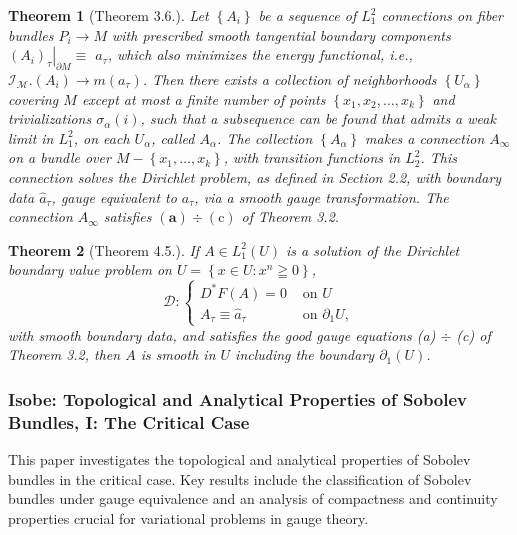 \documentclass[10pt, letterpaper]{article}
\theoremstyle{custom}
\newtheorem{theorem}{Theorem}[section]
\theoremstyle{definition}
\begin{document}
{\small
\begin{theorem}[Theorem 3.6.]
    Let $\left\{A_i\right\}$ be a sequence of $L_1^2$ connections on fiber bundles $P_i \rightarrow M$ with prescribed smooth tangential boundary components $\left.\left(A_i\right)_\tau\right|_{\partial M} \equiv$ $a_\tau$, which also minimizes the energy functional, i.e., $\mathscr{I}_{\mathcal{M}} .\left(A_i\right) \rightarrow m\left(a_\tau\right)$. Then there exists a collection of neighborhoods $\left\{U_\alpha\right\}$ covering $M$ except at most a finite number of points $\left\{x_1, x_2, \ldots, x_k\right\}$ and trivializations $\sigma_\alpha(i)$, such that a subsequence can be found that admits a weak limit in $L_1^2$, on each $U_\alpha$, called $A_\alpha$. The collection $\left\{A_\alpha\right\}$ makes a connection $A_{\infty}$ on a bundle over $M-\left\{x_1, \ldots, x_k\right\}$, with transition functions in $L_2^2$. This connection solves the Dirichlet problem, as defined in Section 2.2, with boundary data $\hat{a}_\tau$, gauge equivalent to $a_\tau$, via a smooth gauge transformation. The connection $A_{\infty}$ satisfies $(\mathbf{a}) \div(\mathrm{c})$ of Theorem 3.2.
\end{theorem}

\begin{theorem}[Theorem 4.5.]
    If $A \in L_1^2(U)$ is a solution of the Dirichlet boundary value problem on $U=\left\{x \in U: x^n \geqq 0\right\}$,
    $$
    \mathscr{D}: \begin{cases}D^* F(A)=0 & \text { on } U \\ A_\tau \equiv \hat{a}_\tau & \text { on } \partial_1 U,\end{cases}
    $$
    with smooth boundary data, and satisfies the good gauge equations (a) $\div$ (c) of Theorem 3.2, then $A$ is smooth in $U$ including the boundary $\partial_1(U)$.
\end{theorem}
}

\subsubsection{Isobe: Topological and Analytical Properties of Sobolev Bundles, I: The Critical Case \cite{isobe2012sobolev}} 
This paper investigates the topological and analytical properties of Sobolev bundles in the critical case. Key results include the classification of Sobolev bundles under gauge equivalence and an analysis of compactness and continuity properties crucial for variational problems in gauge theory.
\end{document}
